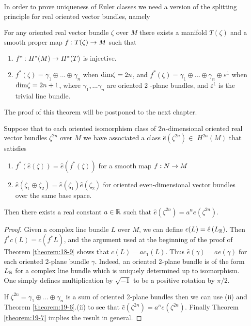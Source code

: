 In order to prove uniqueness of Euler classes we need a version of the splitting principle for real oriented 
vector bundles, namely


\begin{theorem}\label{theorem:19-7}
  For any oriented real vector bundle $\zeta$ over $M$ there exists a 
  manifold $T(\zeta)$ and a smooth proper map $f: T(\zeta) \rightarrow M$ such that
  \begin{enumerate}
    \item $f^{*}: H^{*}(M) \rightarrow H^{*}(T)$ is injective.
    \item $f^{*}(\zeta)=\gamma_{1} \oplus \ldots \oplus \gamma_{n}$ when $\mathrm{dim} \zeta=2 n$, 
      and $f^{*}(\zeta)=\gamma_{1} \oplus \ldots \oplus \gamma_{n} \oplus \varepsilon^{1}$ 
      when $\mathrm{dim} \zeta=2 n+1$, where $\gamma_{1}, \ldots \gamma_{n}$ are oriented 2 -plane bundles, 
      and $\varepsilon^{1}$ is the trivial line bundle. 
  \end{enumerate}
\end{theorem}

The proof of this theorem will be postponed to the next chapter.

\begin{theorem}\label{theorem:19-8}
  Suppose that to each oriented isomorphism class of $2 n$-dimensional oriented real vector bundles $\zeta^{2 n}$ over $M$ 
  we have associated a class $\hat{e}\left(\zeta^{2 n}\right) \in$ $H^{2 n}(M)$ that satisfies
  \begin{enumerate}
    \item $f^{*}(\hat{e}(\zeta))=\hat{e}\left(f^{*}(\zeta)\right)$ for a smooth map $f: N \rightarrow M$
    \item $\hat{e}\left(\zeta_{1} \oplus \zeta_{2}\right)=\hat{e}\left(\zeta_{1}\right) \hat{e}\left(\zeta_{2}\right)$ 
      for oriented even-dimensional vector bundles over the same base space.
  \end{enumerate}
  Then there exists a real constant $a \in {\ensuremath{\mathbb{R}}}$ such that $\hat{e}\left(\zeta^{2 n}\right)=a^{n} e\left(\zeta^{2 n}\right)$.\\
\end{theorem}


\begin{proof}
  Given a complex line bundle $L$ over $M$, we can define $c(L)=\hat{e}\left(L_{{\mathbb{R}}}\right)$. 
  Then $f^{*} c(L)=c\left(f^{*} L\right)$, and the argument used at the beginning of the proof of 
  Theorem \ref{theorem:18-9} shows that $c(L)=a c_{1}(L)$. Thus $\hat{e}(\gamma)=a e(\gamma)$ for 
  each oriented 2-plane bundle $\gamma$. Indeed, an oriented 2-plane bundle is of the 
  form $L_{{\mathbb{R}}}$ for a complex line bundle which is uniquely determined up to isomorphism. One simply 
  defines multiplication by $\sqrt{-1}$ to be a positive rotation by $\pi/2$.
  
  If $\zeta^{2 n}=\gamma_{1} \oplus \ldots \oplus \gamma_{n}$ is a sum of oriented 2-plane bundles then 
  we can use (ii) and Theorem \ref{theorem:19-6}.(ii) to see that $\hat{e}\left(\zeta^{2 n}\right)=a^{n} e\left(\zeta^{2 n}\right)$. 
  Finally Theorem \ref{theorem:19-7} implies the result in general.
\end{proof}

